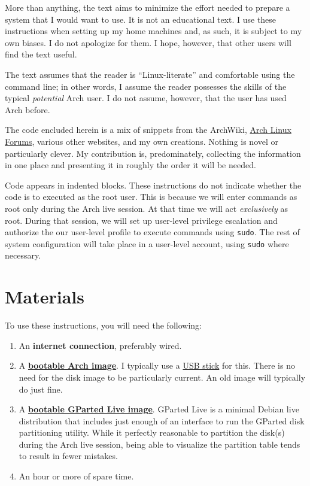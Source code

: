 \documentclass[letterpaper,12pt]{article}
\newcommand{\p}{\par\bigskip}
\begin{document}
More than anything, the text aims to minimize the effort needed to prepare a system that I would want to use. It is not an educational text. I use these instructions when setting up my home machines and, as such, it is subject to my own biases. I do not apologize for them. I hope, however, that other users will find the text useful. \p

The text assumes that the reader is ``Linux-literate'' and comfortable using the command line; in other words, I assume the reader possesses the skills of the typical {\em potential} Arch user. I do not assume, however, that the user has used Arch before. \p

The code encluded herein is a mix of snippets from the ArchWiki, \href{https://bbs.archlinux.org/}{Arch Linux Forums}, various other websites, and my own creations. Nothing is novel or particularly clever. My contribution is, predominately, collecting the information in one place and presenting it in roughly the order it will be needed. \p

Code appears in indented blocks. These instructions do not indicate whether the code is to executed as the root user. This is because we will enter commands as root only during the Arch live session. At that time we will act {\em exclusively} as root. During that session, we will set up user-level privilege escalation and authorize the our user-level profile to execute commands using {\tt sudo}. The rest of system configuration will take place in a user-level account, using {\tt sudo} where necessary. \p

\section{Materials}
To use these instructions, you will need the following:
\begin{enumerate}
  \item An {\bf internet connection}, preferably wired.
  \item A \href{https://www.archlinux.org/download/}{\bf bootable Arch image}. I typically use a \href{https://wiki.archlinux.org/index.php/USB_flash_installation_media}{USB stick} for this. There is no need for the disk image to be particularly current. An old image will typically do just fine.
  \item A \href{https://gparted.org/livecd.php}{\bf bootable GParted Live image}. GParted Live is a minimal Debian live distribution that includes just enough of an interface to run the GParted disk partitioning utility. While it perfectly reasonable to partition the disk(s) during the Arch live session, being able to visualize the partition table tends to result in fewer mistakes.
  \item An hour or more of spare time.
\end{enumerate}
\end{document}
